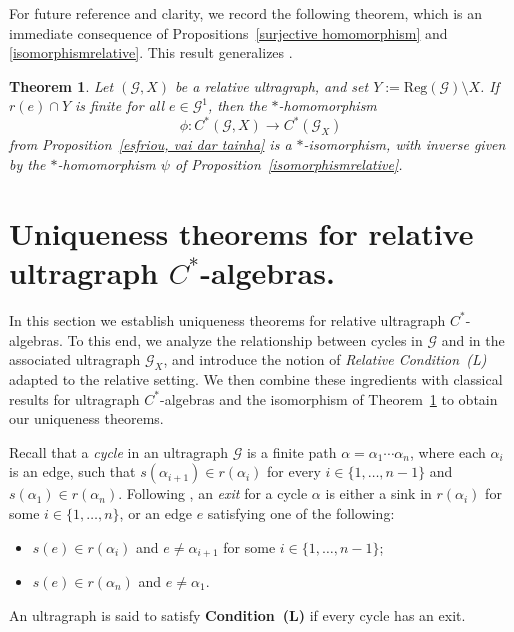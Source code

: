 \documentclass[12pt, reqno]{amsart}
\newtheorem{theorem}{Theorem}[section]
\theoremstyle{definition}
\theoremstyle{remark}
\numberwithin{equation}{section}
\begin{document}


For future reference and clarity, we record the following theorem, which is an immediate
consequence of Propositions~\ref{surjective homomorphism} and \ref{isomorphismrelative}.
This result generalizes \cite[Theorem~3.7]{Tom}.

\begin{theorem}\label{teo iso algebras ultragrafos e relativas}
Let $(\mathcal{G},X)$ be a relative ultragraph, and set
$Y := \mathrm{Reg}(\mathcal{G}) \setminus X$. If $r(e) \cap Y$ is finite for all
$e \in \mathcal{G}^1$, then the $*$-homomorphism
\[
\phi: C^*(\mathcal{G},X) \to C^*(\mathcal{G}_X)
\]
from Proposition~\ref{esfriou, vai dar tainha} is a $*$-isomorphism, with inverse given by the
$*$-homomorphism $\psi$ of Proposition~\ref{isomorphismrelative}.
\end{theorem}



\section{Uniqueness theorems for relative ultragraph $C^*$-algebras.}



In this section we establish uniqueness theorems for relative ultragraph $C^*$-algebras.
To this end, we analyze the relationship between cycles in $\mathcal{G}$ and in the associated
ultragraph $\mathcal{G}_X$, and introduce the notion of \emph{Relative Condition~(L)} adapted to
the relative setting. We then combine these ingredients with classical results for ultragraph
$C^*$-algebras and the isomorphism of
Theorem~\ref{teo iso algebras ultragrafos e relativas} to obtain our uniqueness theorems.


Recall that a \emph{cycle} in an ultragraph $\mathcal{G}$ is a finite path
$\alpha=\alpha_1 \cdots \alpha_n$, where each $\alpha_i$ is an edge, such that
$s(\alpha_{i+1}) \in r(\alpha_i)$ for every $i \in \{1,\dots,n-1\}$ and
$s(\alpha_1) \in r(\alpha_n)$. Following \cite{Tom2}, an \emph{exit} for a cycle $\alpha$ is
either a sink in $r(\alpha_i)$ for some $i \in \{1,\dots,n\}$, or an edge $e$ satisfying one of
the following:
\begin{itemize}
    \item $s(e) \in r(\alpha_i)$ and $e \neq \alpha_{i+1}$ for some $i \in \{1,\dots,n-1\}$;
    \item $s(e) \in r(\alpha_n)$ and $e \neq \alpha_1$.
\end{itemize}
An ultragraph is said to satisfy \textbf{Condition~(L)} if every cycle has an exit.
\end{document}
